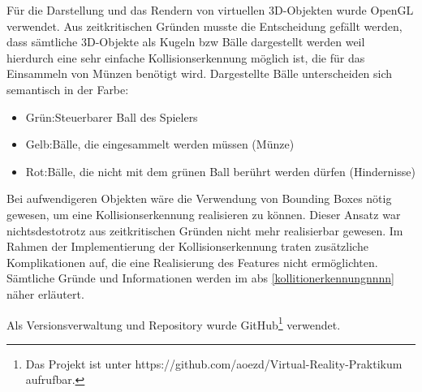 Für die Darstellung und das Rendern von virtuellen 3D-Objekten wurde OpenGL verwendet. Aus zeitkritischen Gründen musste die Entscheidung gefällt werden, dass sämtliche 3D-Objekte als Kugeln \acs{bzw} Bälle dargestellt werden weil hierdurch eine sehr einfache Kollisionserkennung möglich ist, die für das Einsammeln von Münzen benötigt wird. Dargestellte Bälle unterscheiden sich semantisch in der Farbe:

\begin{itemize}[label=]
    \item Grün:\hspace{0.8cm}Steuerbarer Ball des Spielers
    \item Gelb:\hspace{0.85cm}Bälle, die eingesammelt werden müssen (Münze)
    \item Rot:\hspace{1.0cm}Bälle, die nicht mit dem grünen Ball berührt werden dürfen (Hindernisse)
\end{itemize}

\noindent Bei aufwendigeren Objekten wäre die Verwendung von Bounding Boxes nötig gewesen, um eine Kollisionserkennung realisieren zu können. Dieser Ansatz war nichtsdestotrotz aus zeitkritischen Gründen nicht mehr realisierbar gewesen. Im Rahmen der Implementierung der Kollisionserkennung traten zusätzliche Komplikationen auf, die eine Realisierung des Features nicht ermöglichten. Sämtliche Gründe und Informationen werden im \acs{abs} \ref{kollitionerkennungnnnn} näher erläutert.

Als Versionsverwaltung und Repository wurde GitHub\footnote{Das Projekt ist unter https://github.com/aoezd/Virtual-Reality-Praktikum aufrufbar.} verwendet.


\newpage